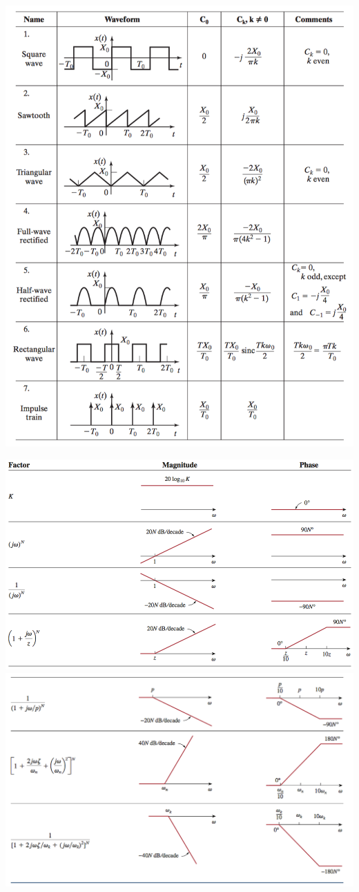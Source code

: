 \documentclass[landscape,a4paper]{article}
\begin{document}
\begin{minipage}{0.48\linewidth}
\includegraphics[width=0.95\linewidth]{1.png}
\end{minipage}
\begin{minipage}{0.48\linewidth}
\includegraphics[width=0.95\linewidth]{2.png}
\includegraphics[width=0.95\linewidth]{3.png}
\end{minipage}
\end{document}
